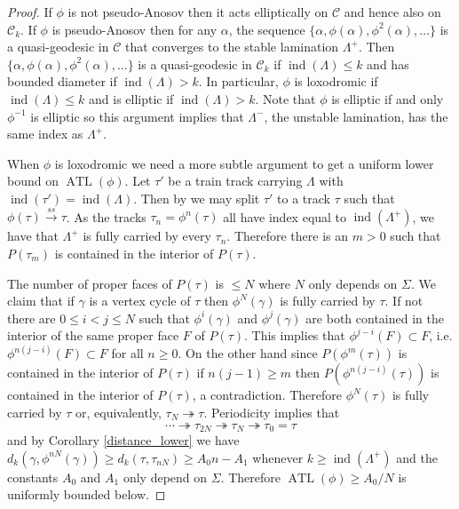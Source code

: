 \documentclass[11pt]{article}
\theoremstyle{remark}
\def\C{{\mathcal C}}
\def\ind{\operatorname{ind}}
\def\ss{{\overset{ss}\longrightarrow}}
\newcommand{\ATL}{\operatorname{ATL}}
\begin{document}
\begin{proof}
  If $\phi$ is not pseudo-Anosov then it acts elliptically on $\C$ and hence
  also on $\C_k$.
If $\phi$ is pseudo-Anosov then for any $\alpha$, the sequence $\{\alpha, \phi(\alpha), \phi^2(\alpha), \dots\}$ is a quasi-geodesic in $\C$ that converges to the stable lamination $\Lambda^+$.
Then $\{\alpha, \phi(\alpha), \phi^2(\alpha), \dots\}$ is a quasi-geodesic in $\C_k$ if $\ind(\Lambda) \le k$ and has bounded diameter if $\ind(\Lambda) > k$. In particular, $\phi$ is loxodromic if $\ind(\Lambda) \le k$ and is elliptic if $\ind(\Lambda) > k$. Note that $\phi$ is elliptic if and only $\phi^{-1}$ is elliptic so this argument implies that $\Lambda^-$, the unstable lamination, has the same index as $\Lambda^+$.

When $\phi$ is loxodromic we need a more subtle argument to get a uniform lower bound on $\ATL(\phi)$.
Let $\tau'$ be a train track carrying $\Lambda$ with $\ind(\tau') =\ind(\Lambda)$. Then by
  \cite[Section 3]{Agol} we may split $\tau'$ to a track $\tau$
  such that $\phi(\tau) \ss \tau$. As the tracks $\tau_n=\phi^n(\tau)$ all have index equal to $\ind(\Lambda^+)$, we have that $\Lambda^+$ is fully carried by every $\tau_n$. Therefore there is an $m>0$ such that $P(\tau_m)$ is contained in the interior of $P(\tau)$.
   
The number of proper faces of $P(\tau)$ is $\le N$ where $N$ only depends on $\Sigma$. We claim that if $\gamma$ is a vertex cycle of $\tau$ then $\phi^N(\gamma)$ is fully carried by $\tau$. If not there are $0\le i<j\le N$ such that $\phi^i(\gamma)$ and $\phi^j(\gamma)$ are both contained in the interior of the same proper face $F$ of $P(\tau)$. This implies that $\phi^{j-i}(F) \subset F$, i.e. $\phi^{n(j-i)}(F) \subset F$ for all $n\ge 0$. On the other hand since $P(\phi^m(\tau))$ is contained in the interior of $P(\tau)$ if $n(j-1) \ge m$ then $P(\phi^{n(j-i)}(\tau))$ is contained in the interior of $P(\tau)$, a contradiction. Therefore $\phi^N(\tau)$ is fully carried by $\tau$ or, equivalently, $\tau_N \twoheadrightarrow \tau$. Periodicity implies that
$$\cdots \twoheadrightarrow \tau_{2N} \twoheadrightarrow \tau_N \twoheadrightarrow \tau_0 = \tau$$
and by Corollary \ref{distance_lower} we have $d_k(\gamma, \phi^{nN}(\gamma))\ge d_k(\tau, \tau_{nN}) \ge A_0 n - A_1$ whenever $k \ge \ind(\Lambda^+)$ and the constants $A_0$ and $A_1$ only depend on $\Sigma$. Therefore $\ATL(\phi) \ge A_0/N$ is uniformly bounded below. 
\end{proof}
\end{document}
